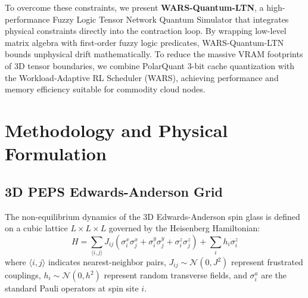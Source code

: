 \documentclass[sigconf,nonacm=false]{acmart}
\begin{document}
To overcome these constraints, we present \textbf{WARS-Quantum-LTN}, a high-performance Fuzzy Logic Tensor Network Quantum Simulator that integrates physical constraints directly into the contraction loop. By wrapping low-level matrix algebra with first-order fuzzy logic predicates, WARS-Quantum-LTN bounds unphysical drift mathematically. To reduce the massive VRAM footprints of 3D tensor boundaries, we combine PolarQuant 3-bit cache quantization with the Workload-Adaptive RL Scheduler (WARS), achieving performance and memory efficiency suitable for commodity cloud nodes.

\section{Methodology and Physical Formulation}
\label{sec:methodology}

\subsection{3D PEPS Edwards-Anderson Grid}
The non-equilibrium dynamics of the 3D Edwards-Anderson spin glass is defined on a cubic lattice $L \times L \times L$ governed by the Heisenberg Hamiltonian:
\begin{equation}
H = \sum_{\langle i, j \rangle} J_{ij} \left( \sigma_i^x \sigma_j^x + \sigma_i^y \sigma_j^y + \sigma_i^z \sigma_j^z \right) + \sum_i h_i \sigma_i^z
\end{equation}
where $\langle i, j \rangle$ indicates nearest-neighbor pairs, $J_{ij} \sim \mathcal{N}(0, J^2)$ represent frustrated couplings, $h_i \sim \mathcal{N}(0, h^2)$ represent random transverse fields, and $\sigma_i^a$ are the standard Pauli operators at spin site $i$.
\end{document}
